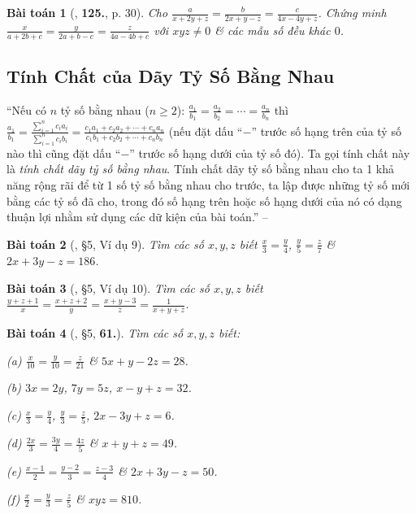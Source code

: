 \documentclass{article}
\numberwithin{equation}{section}
\newtheorem{baitoan}{Bài toán}
\begin{document}
\begin{baitoan}[\cite{Tuyen_Toan_7}, \textbf{125.}, p. 30]
	Cho $\frac{a}{x + 2y + z} = \frac{b}{2x + y - z} = \frac{c}{4x - 4y + z}$. Chứng minh $\frac{x}{a + 2b + c} = \frac{y}{2a + b - c} = \frac{z}{4a - 4b + c}$ với $xyz\ne 0$ \& các mẫu số đều khác $0$.
\end{baitoan}


\subsection{Tính Chất của Dãy Tỷ Số Bằng Nhau}
``Nếu có $n$ tỷ số bằng nhau ($n\ge 2$): $\frac{a_1}{b_1} = \frac{a_2}{b_2} = \cdots = \frac{a_n}{b_n}$ thì $\frac{a_1}{b_1} = \frac{\sum_{i=1}^n c_ia_i}{\sum_{i=1}^n c_ib_i} = \frac{c_1a_1 + c_2a_2 + \cdots + c_na_n}{c_1b_1 + c_2b_2 + \cdots + c_nb_n}$ (nếu đặt dấu ``$-$'' trước số hạng trên của tỷ số nào thì cũng đặt dấu ``$-$'' trước số hạng dưới của tỷ số đó). Ta gọi tính chất này là \textit{tính chất dãy tỷ số bằng nhau}. Tính chất dãy tỷ số bằng nhau cho ta 1 khả năng rộng rãi để từ 1 số tỷ số bằng nhau cho trước, ta lập được những tỷ số mới bằng các tỷ số đã cho, trong đó số hạng trên hoặc số hạng dưới của nó có dạng thuận lợi nhằm sử dụng các dữ kiện của bài toán.'' -- \cite[\S5]{Binh_Toan_7_tap_1}

\begin{baitoan}[\cite{Binh_Toan_7_tap_1}, \S5, Ví dụ 9]
	Tìm các số $x,y,z$ biết $\frac{x}{3} = \frac{y}{4}$, $\frac{y}{5} = \frac{z}{7}$ \& $2x + 3y - z = 186$.
\end{baitoan}

\begin{baitoan}[\cite{Binh_Toan_7_tap_1}, \S5, Ví dụ 10]
	Tìm các số $x,y,z$ biết $\frac{y + z + 1}{x} = \frac{x + z + 2}{y} = \frac{x + y - 3}{z} = \frac{1}{x + y + z}$.
\end{baitoan}

\begin{baitoan}[\cite{Binh_Toan_7_tap_1}, \S5, \textbf{61.}]
	Tìm các số $x,y,z$ biết:
	\begin{enumerate*}
		\item[(a)] $\frac{x}{10} = \frac{y}{10} = \frac{z}{21}$ \& $5x + y - 2z = 28$.
		\item[(b)] $3x = 2y$, $7y = 5z$, $x - y + z = 32$.
		\item[(c)] $\frac{x}{3} = \frac{y}{4}$, $\frac{y}{3} = \frac{z}{5}$, $2x - 3y + z = 6$.
		\item[(d)] $\frac{2x}{3} = \frac{3y}{4} = \frac{4z}{5}$ \& $x + y + z = 49$.
		\item[(e)] $\frac{x - 1}{2} = \frac{y - 2}{3} = \frac{z - 3}{4}$ \& $2x + 3y - z = 50$.
		\item[(f)] $\frac{x}{2} = \frac{y}{3} = \frac{z}{5}$ \& $xyz = 810$.
	\end{enumerate*}
\end{baitoan}
\end{document}
